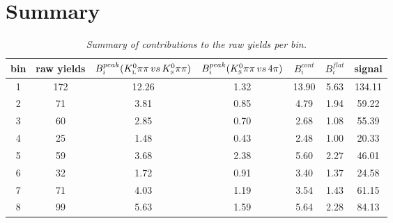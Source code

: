 \section{Summary}
\begin{table}[!h]
	\begin{center}
		\begin{tabular}{c| c | c | c| c|c|c }
		bin & raw yields & $B^{peak}_i({K^0_{\rm\scriptscriptstyle L}}{\pi}\pi\, vs\, {K^0_{\rm\scriptscriptstyle S}}{\pi}\pi)$ & $B^{peak}_i({K^0_{\rm\scriptscriptstyle S}}{\pi}\pi\, vs\, 4\pi)$ & $B_i^{cont}$ & $B_i^{flat}$ & signal  \\
		\hline 
		\hline
1 & 172 & 12.26 & 1.32 & 13.90 & 5.63 & 134.11 \\ 
2 & 71 & 3.81 & 0.85 & 4.79 & 1.94 & 59.22 \\ 
3 & 60 & 2.85 & 0.70 & 2.68 & 1.08 & 55.39 \\ 
4 & 25 & 1.48 & 0.43 & 2.48 & 1.00 & 20.33 \\ 
5 & 59 & 3.68 & 2.38 & 5.60 & 2.27 & 46.01 \\ 
6 & 32 & 1.72 & 0.91 & 3.40 & 1.37 & 24.58 \\ 
7 & 71 & 4.03 & 1.19 & 3.54 & 1.43 & 61.15 \\ 
8 & 99 & 5.63 & 1.59 & 5.64 & 2.28 & 84.13 \\	
		\end{tabular}
	\end{center}
	\caption{\textit{Summary of contributions to the raw yields per bin.}}
\end{table}
